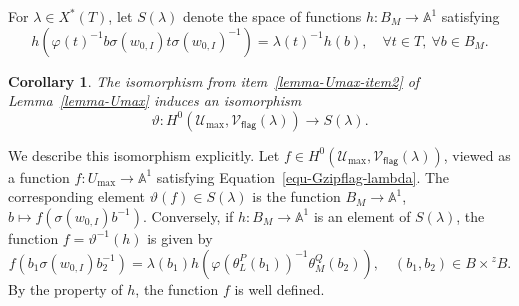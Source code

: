\documentclass[11pt]{amsart}
\numberwithin{equation}{section}
\newtheorem{corollary}[theorem]{Corollary}
\theoremstyle{definition}
\theoremstyle{remark}
\newcommand{\flag}{\mathsf{flag}}
\newcommand{\Ucal}{{\mathcal U}}
\newcommand{\Vcal}{{\mathcal V}}
\renewcommand{\AA}{\mathbb{A}}
\newcommand{\lra}{\longrightarrow}
\begin{document}
For $\lambda\in X^*(T)$, let $S(\lambda)$ denote the space of functions $h\colon B_M\to \AA^1$ satisfying
\begin{equation}\label{equ-Slambda}
h\left(\varphi(t)^{-1}b\sigma(w_{0,I}) t\sigma(w_{0,I})^{-1}\right)=\lambda(t)^{-1} h(b), \quad \forall t\in T, \ \forall b\in B_M.
\end{equation}

\begin{corollary}
The isomorphism from item~\eqref{lemma-Umax-item2} of Lemma~\ref{lemma-Umax} induces an isomorphism
\begin{equation}
  \vartheta \colon  H^0\left(\Ucal_{\max},\Vcal_{\flag}(\lambda)\right)\lra S(\lambda).
\end{equation}
\end{corollary}
We describe this isomorphism explicitly. Let $f\in H^0(\Ucal_{\max},\Vcal_{\flag}(\lambda))$, 
viewed as a function $f\colon U_{\max}\to \AA^1$ satisfying Equation~\eqref{equ-Gzipflag-lambda}. The corresponding element $\vartheta(f)\in S(\lambda)$ is the function $B_M \to \AA^1$, $b\mapsto f(\sigma(w_{0,I})b^{-1})$. Conversely, if $h\colon B_M\to \AA^1$ is an element of $S(\lambda)$, the function $f=\vartheta^{-1}(h)$ is given by
\begin{equation}\label{equ-relationf}
f\left(b_1 \sigma(w_{0,I}) b_2^{-1}\right) = \lambda(b_1) h\left(\varphi\left(\theta^P_L(b_1)\right)^{-1} \theta^Q_M(b_2)\right), \quad (b_1,b_2)\in B\times {}^zB.
\end{equation}
By the property of $h$, the function $f$ is well defined.
\end{document}
